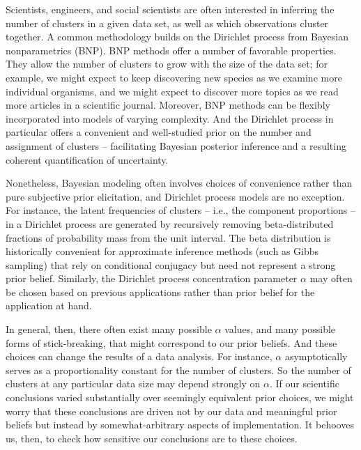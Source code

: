 Scientists, engineers, and social scientists are often interested in inferring
the number of clusters in a given data set, as well as which observations
cluster together. A common methodology builds on the Dirichlet process
\citep{ferguson:1973:bayesian, sethuraman:1994:constructivedp} from Bayesian
nonparametrics (BNP). BNP methods offer a number of favorable properties. They
allow the number of clusters to grow with the size of the data set; for example,
we might expect to keep discovering new species as we examine more individual
organisms, and we might expect to discover more topics as we read more articles
in a scientific journal. Moreover, BNP methods can be flexibly incorporated into
models of varying complexity. And the Dirichlet process in particular offers a
convenient and well-studied prior on the number and assignment of clusters --
facilitating Bayesian posterior inference and a resulting coherent
quantification of uncertainty.

Nonetheless, Bayesian modeling often involves choices of convenience rather than
pure subjective prior elicitation, and Dirichlet process models are no
exception. For instance, the latent frequencies of clusters -- i.e., the
component proportions -- in a Dirichlet process are generated by recursively
removing beta-distributed fractions of probability mass from the unit interval.
The beta distribution is historically convenient for approximate inference
methods (such as Gibbs sampling) that rely on conditional conjugacy but need not
represent a strong prior belief. Similarly, the Dirichlet process concentration
parameter $\alpha$ may often be chosen based on previous applications rather
than prior belief for the application at hand.

In general, then, there often exist many possible $\alpha$ values, and many
possible forms of stick-breaking, that might correspond to our prior beliefs.
And these choices can change the results of a data analysis. For instance,
$\alpha$ asymptotically serves as a proportionality constant for the number of
clusters. So the number of clusters at any particular data size may depend
strongly on $\alpha$. If our scientific conclusions varied substantially over
seemingly equivalent prior choices, we might worry that these conclusions are
driven not by our data and meaningful prior beliefs but instead by
somewhat-arbitrary aspects of implementation. It behooves us, then, to check how
sensitive our conclusions are to these choices.


